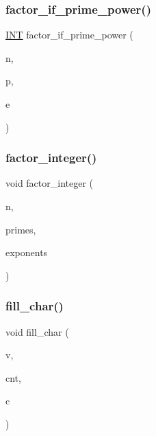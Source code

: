 \subsubsection{\texorpdfstring{factor\+\_\+if\+\_\+prime\+\_\+power()}{factor\_if\_prime\_power()}}
{\footnotesize\ttfamily \mbox{\hyperlink{galois_8h_a09fddde158a3a20bd2dcadb609de11dc}{I\+NT}} factor\+\_\+if\+\_\+prime\+\_\+power (\begin{DoxyParamCaption}\item[{\mbox{\hyperlink{galois_8h_a09fddde158a3a20bd2dcadb609de11dc}{I\+NT}}}]{n,  }\item[{\mbox{\hyperlink{galois_8h_a09fddde158a3a20bd2dcadb609de11dc}{I\+NT}} $\ast$}]{p,  }\item[{\mbox{\hyperlink{galois_8h_a09fddde158a3a20bd2dcadb609de11dc}{I\+NT}} $\ast$}]{e }\end{DoxyParamCaption})}

\mbox{\label{global_8_c_ab7a2d5a4156f2d475fa1b257a3380ef6}} 
\subsubsection{\texorpdfstring{factor\+\_\+integer()}{factor\_integer()}}
{\footnotesize\ttfamily void factor\+\_\+integer (\begin{DoxyParamCaption}\item[{\mbox{\hyperlink{galois_8h_a09fddde158a3a20bd2dcadb609de11dc}{I\+NT}}}]{n,  }\item[{\mbox{\hyperlink{class_vector}{Vector}} \&}]{primes,  }\item[{\mbox{\hyperlink{class_vector}{Vector}} \&}]{exponents }\end{DoxyParamCaption})}

\mbox{\label{global_8_c_a0429f5462bfcfd509d83bc1f7ebfc818}} 
\subsubsection{\texorpdfstring{fill\+\_\+char()}{fill\_char()}}
{\footnotesize\ttfamily void fill\+\_\+char (\begin{DoxyParamCaption}\item[{void $\ast$}]{v,  }\item[{\mbox{\hyperlink{galois_8h_a09fddde158a3a20bd2dcadb609de11dc}{I\+NT}}}]{cnt,  }\item[{\mbox{\hyperlink{galois_8h_a09fddde158a3a20bd2dcadb609de11dc}{I\+NT}}}]{c }\end{DoxyParamCaption})}

